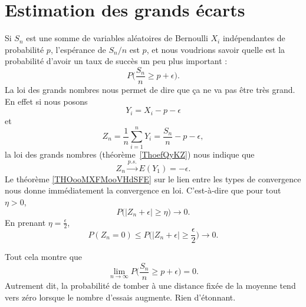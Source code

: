 \section{Estimation des grands écarts}

Si \( S_n\) est une somme de variables aléatoires de Bernoulli \( X_i\) indépendantes de probabilité \( p\), l'espérance de \( S_n/n\) est \( p\), et nous voudrions savoir quelle est la probabilité d'avoir un taux de succès un peu plus important :
\begin{equation}
	P\big( \frac{ S_n }{ n }\geq p+\epsilon \big).
\end{equation}
La loi des grands nombres nous permet de dire que ça ne va pas être très grand. En effet si nous posons
\begin{equation}
	Y_i=X_i-p-\epsilon
\end{equation}
et
\begin{equation}
	Z_n=\frac{1}{ n }\sum_{i=1}^nY_i=\frac{ S_n }{ n }-p-\epsilon,
\end{equation}
la loi des grands nombres (théorème~\ref{ThoefQyKZ}) nous indique que
\begin{equation}
	Z_n\stackrel{p.s.}{\longrightarrow}E(Y_1)=-\epsilon.
\end{equation}
Le théorème \ref{THOooMXFMooVHdSFE} sur le lien entre les types de convergence nous donne immédiatement la convergence en loi. C'est-à-dire que pour tout \( \eta>0\),
\begin{equation}
	P\Big( | Z_n+\epsilon |\geq \eta \Big)\to 0.
\end{equation}
En prenant \( \eta=\frac{ \epsilon }{2}\),
\begin{equation}
	P(Z_n=0)\leq P\big( | Z_n+\epsilon |\geq \frac{ \epsilon }{2} \big)\to 0.
\end{equation}

Tout cela montre que
\begin{equation}
	\lim_{n\to \infty} P\big( \frac{ S_n }{ n }\geq p+\epsilon \big)=0.
\end{equation}
Autrement dit, la probabilité de tomber à une distance fixée de la moyenne tend vers zéro lorsque le nombre d'essais augmente. Rien d'étonnant.

